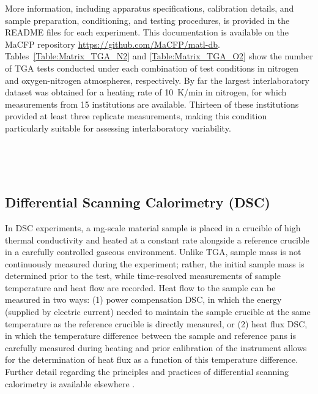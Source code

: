 \documentclass{book}
\begin{document}
More information, including apparatus specifications, calibration details, and sample preparation, conditioning, and testing procedures, is provided in the README files for each experiment. This documentation is available on the MaCFP repository \href{https://github.com/MaCFP/matl-db}{https://github.com/MaCFP/matl-db}. Tables~\ref{Table:Matrix_TGA_N2} and \ref{Table:Matrix_TGA_O2} show the number of TGA tests conducted under each combination of test conditions in nitrogen and oxygen-nitrogen atmospheres, respectively. By far the largest interlaboratory dataset was obtained for a heating rate of 10~K/min in nitrogen, for which measurements from 15 institutions are available. Thirteen of these institutions provided at least three replicate measurements, making this condition particularly suitable for assessing interlaboratory variability.

\begin{table}[ht]
	\caption{Test Matrix of TGA Tests Conducted in Nitrogen; table values indicate number of tests conducted under listed test conditions}
	\label{Table:Matrix_TGA_N2}
	\begin{center}
		\\
	\end{center}
\end{table}

\begin{table} [h]
\caption{Test Matrix of TGA Tests Conducted in Oxygen-Nitrogen Atmospheres; table values indicate number of tests conducted under listed test conditions}
\label{Table:Matrix_TGA_O2}
    \begin{center}
        \\
    \end{center}
\end{table}

\subsection{Differential Scanning Calorimetry (DSC)}
In DSC experiments, a mg-scale material sample is placed in a crucible of high thermal conductivity and heated at a constant rate alongside a reference crucible in a carefully controlled gaseous environment. Unlike TGA, sample mass is not continuously measured during the experiment; rather, the initial sample mass is determined prior to the test, while time-resolved measurements of sample temperature and heat flow are recorded. Heat flow to the sample can be measured in two ways: (1) power compensation DSC, in which the energy (supplied by electric current) needed to maintain the sample crucible at the same temperature as the reference crucible is directly measured, or (2) heat flux DSC, in which the temperature difference between the sample and reference pans is carefully measured during heating and prior calibration of the instrument allows for the determination of heat flux as a function of this temperature difference. Further detail regarding the principles and practices of differential scanning calorimetry is available elsewhere \cite{mcnaughton2003differential}.
\end{document}
